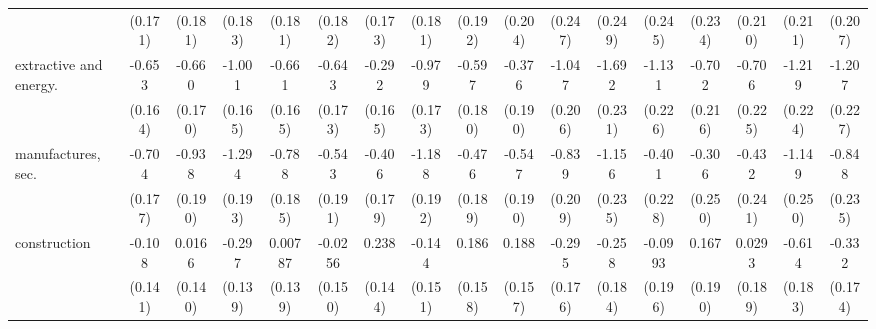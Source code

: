 {\begin{tabular}{l*{16}{c}}
                    &     (0.171)         &     (0.181)         &     (0.183)         &     (0.181)         &     (0.182)         &     (0.173)         &     (0.181)         &     (0.192)         &     (0.204)         &     (0.247)         &     (0.249)         &     (0.245)         &     (0.234)         &     (0.210)         &     (0.211)         &     (0.207)         \\
[1em]
extractive and energy.&      -0.653\sym{***}&      -0.660\sym{***}&      -1.001\sym{***}&      -0.661\sym{***}&      -0.643\sym{***}&      -0.292         &      -0.979\sym{***}&      -0.597\sym{***}&      -0.376\sym{*}  &      -1.047\sym{***}&      -1.692\sym{***}&      -1.131\sym{***}&      -0.702\sym{**} &      -0.706\sym{**} &      -1.219\sym{***}&      -1.207\sym{***}\\
                    &     (0.164)         &     (0.170)         &     (0.165)         &     (0.165)         &     (0.173)         &     (0.165)         &     (0.173)         &     (0.180)         &     (0.190)         &     (0.206)         &     (0.231)         &     (0.226)         &     (0.216)         &     (0.225)         &     (0.224)         &     (0.227)         \\
[1em]
manufactures, sec.  &      -0.704\sym{***}&      -0.938\sym{***}&      -1.294\sym{***}&      -0.788\sym{***}&      -0.543\sym{**} &      -0.406\sym{*}  &      -1.188\sym{***}&      -0.476\sym{*}  &      -0.547\sym{**} &      -0.839\sym{***}&      -1.156\sym{***}&      -0.401         &      -0.306         &      -0.432         &      -1.149\sym{***}&      -0.848\sym{***}\\
                    &     (0.177)         &     (0.190)         &     (0.193)         &     (0.185)         &     (0.191)         &     (0.179)         &     (0.192)         &     (0.189)         &     (0.190)         &     (0.209)         &     (0.235)         &     (0.228)         &     (0.250)         &     (0.241)         &     (0.250)         &     (0.235)         \\
[1em]
construction        &      -0.108         &      0.0166         &      -0.297\sym{*}  &     0.00787         &     -0.0256         &       0.238         &      -0.144         &       0.186         &       0.188         &      -0.295         &      -0.258         &     -0.0993         &       0.167         &      0.0293         &      -0.614\sym{***}&      -0.332         \\
                    &     (0.141)         &     (0.140)         &     (0.139)         &     (0.139)         &     (0.150)         &     (0.144)         &     (0.151)         &     (0.158)         &     (0.157)         &     (0.176)         &     (0.184)         &     (0.196)         &     (0.190)         &     (0.189)         &     (0.183)         &     (0.174)         \\

\end{tabular}}
